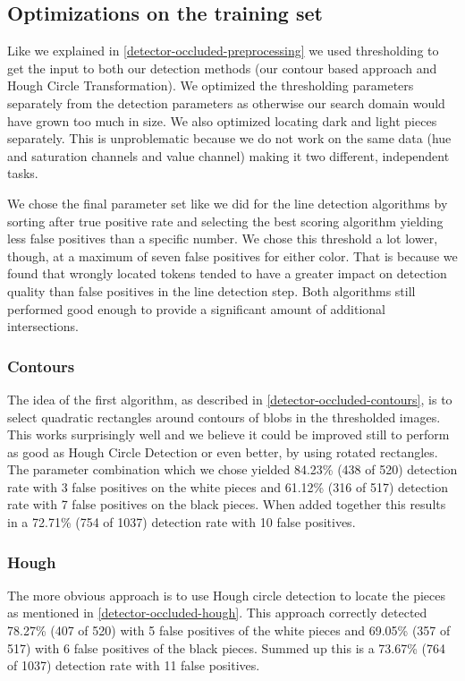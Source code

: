	\subsection{Optimizations on the training set}
	\label{evaluation-occluded-optimization}
	Like we explained in \autoref{detector-occluded-preprocessing} we used thresholding to get the input to both our detection methods (our contour based approach and Hough Circle Transformation). We optimized the thresholding parameters separately from the detection parameters as otherwise our search domain would have grown too much in size. We also optimized locating dark and light pieces separately. This is unproblematic because we do not work on the same data (hue and saturation channels and value channel) making it two different, independent tasks.

	We chose the final parameter set like we did for the line detection algorithms by sorting after true positive rate and selecting the best scoring algorithm yielding less false positives than a specific number. We chose this threshold a lot lower, though, at a maximum of seven false positives for either color. That is because we found that wrongly located tokens tended to have a greater impact on detection quality than false positives in the line detection step. Both algorithms still performed good enough to provide a significant amount of additional intersections.

	\subsubsection{Contours}
	\label{evaluation-occluded-optimization-contours}
	The idea of the first algorithm, as described in \autoref{detector-occluded-contours}, is to select quadratic rectangles around contours of blobs in the thresholded images. This works surprisingly well and we believe it could be improved still to perform as good as Hough Circle Detection or even better, by using rotated rectangles. The parameter combination which we chose yielded 84.23\% (438 of 520) detection rate with 3 false positives on the white pieces and 61.12\% (316 of 517) detection rate with 7 false positives on the black pieces. When added together this results in a 72.71\% (754 of 1037) detection rate with 10 false positives.

	\subsubsection{Hough}
	\label{evaluation-occluded-optimization-hough}
	The more obvious approach is to use Hough circle detection to locate the pieces as mentioned in \autoref{detector-occluded-hough}. This approach correctly detected 78.27\% (407 of 520) with 5 false positives of the white pieces and 69.05\% (357 of 517) with 6 false positives of the black pieces. Summed up this is a 73.67\% (764 of 1037) detection rate with 11 false positives.

